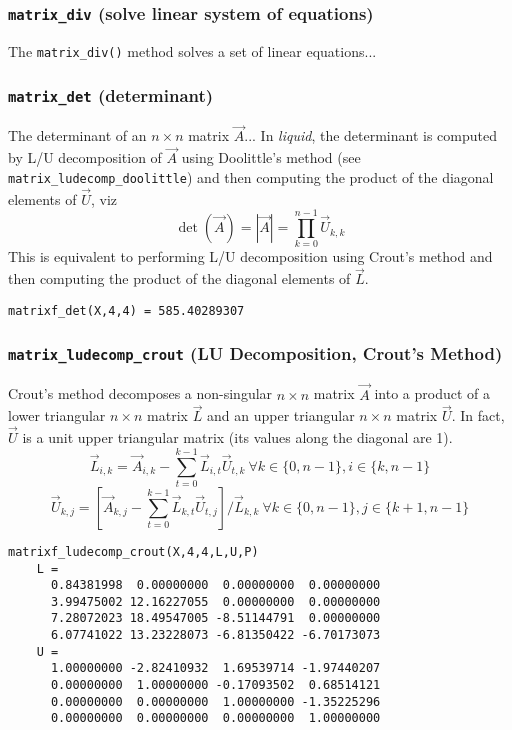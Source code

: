 \subsubsection{{\tt matrix\_div} (solve linear system of equations)}
\label{module:matrix:div}
The {\tt matrix\_div()} method solves a set of linear equations...

\subsubsection{{\tt matrix\_det} (determinant)}
\label{module:matrix:det}
The determinant of an $n \times n$ matrix $\vec{A}$...
In {\it liquid}, the determinant is computed by L/U decomposition of $\vec{A}$
using Doolittle's method (see {\tt matrix\_ludecomp\_doolittle}) and then
computing the product of the diagonal elements of $\vec{U}$, viz
\[
    \det\left(\vec{A}\right) =
    \left|\vec{A}\right| =
    \prod_{k=0}^{n-1}{\vec{U}_{k,k}}
\]
This is equivalent to performing L/U decomposition using Crout's method and
then computing the product of the diagonal elements of $\vec{L}$.
\begin{Verbatim}[fontsize=\small]
    matrixf_det(X,4,4) = 585.40289307
\end{Verbatim}

\subsubsection{{\tt matrix\_ludecomp\_crout} (LU Decomposition, Crout's Method)}
\label{module:matrix:ludecomp_crout}
Crout's method decomposes a non-singular $n\times n$ matrix $\vec{A}$ into a
product of a lower triangular $n \times n$ matrix $\vec{L}$ and an upper
triangular $n \times n$ matrix $\vec{U}$. %
In fact, $\vec{U}$ is a unit upper triangular matrix (its values along the
diagonal are 1).
%
\[
    \vec{L}_{i,k} = \vec{A}_{i,k} -
                    \sum_{t=0}^{k-1}{ \vec{L}_{i,t} \vec{U}_{t,k} }
                    \ \forall k \in \{0,n-1\}, i \in \{k,n-1\}
\]
%
\[
    \vec{U}_{k,j} = \left[
                        \vec{A}_{k,j} -
                        \sum_{t=0}^{k-1}{ \vec{L}_{k,t} \vec{U}_{t,j} }
                    \right] / \vec{L}_{k,k}
                    \ \forall k \in \{0,n-1\}, j \in \{k+1,n-1\}
\]
%
\begin{Verbatim}[fontsize=\small]
    matrixf_ludecomp_crout(X,4,4,L,U,P)
    L =
      0.84381998  0.00000000  0.00000000  0.00000000
      3.99475002 12.16227055  0.00000000  0.00000000
      7.28072023 18.49547005 -8.51144791  0.00000000
      6.07741022 13.23228073 -6.81350422 -6.70173073
    U =
      1.00000000 -2.82410932  1.69539714 -1.97440207
      0.00000000  1.00000000 -0.17093502  0.68514121
      0.00000000  0.00000000  1.00000000 -1.35225296
      0.00000000  0.00000000  0.00000000  1.00000000
\end{Verbatim}

